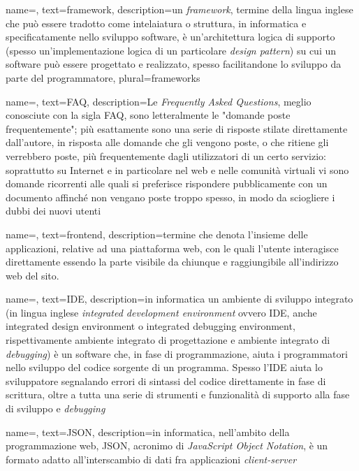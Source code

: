 {
    name=,
    text=framework,
    description={un \emph{framework}, termine della lingua inglese che può essere tradotto come intelaiatura o struttura, in informatica e specificatamente nello sviluppo software, è un'architettura logica di supporto (spesso un'implementazione logica di un particolare \emph{design pattern}) su cui un software può essere progettato e realizzato, spesso facilitandone lo sviluppo da parte del programmatore},
    plural=frameworks
}

{
    name=,
    text=FAQ,
    description={Le \emph{Frequently Asked Questions}, meglio conosciute con la sigla FAQ, sono letteralmente le "domande poste frequentemente"; più esattamente sono una serie di risposte stilate direttamente dall'autore, in risposta alle domande che gli vengono poste, o che ritiene gli verrebbero poste, più frequentemente dagli utilizzatori di un certo servizio: soprattutto su Internet e in particolare nel web e nelle comunità virtuali vi sono domande ricorrenti alle quali si preferisce rispondere pubblicamente con un documento affinché non vengano poste troppo spesso, in modo da sciogliere i dubbi dei nuovi utenti}
}

{
    name=,
    text=frontend,
    description={termine che denota l’insieme delle applicazioni, relative ad una piattaforma
web, con le quali l’utente interagisce direttamente essendo la parte visibile da chiunque e raggiungibile all'indirizzo web del sito.}
}

{
    name=,
    text=IDE,
    description={in informatica un ambiente di sviluppo
integrato (in lingua inglese \emph{integrated development environment} ovvero IDE,
anche integrated design environment o integrated debugging environment, rispettivamente
ambiente integrato di progettazione e ambiente integrato di \emph{debugging})
è un software che, in fase di programmazione, aiuta i programmatori nello sviluppo
del codice sorgente di un programma. Spesso l’IDE aiuta lo sviluppatore
segnalando errori di sintassi del codice direttamente in fase di scrittura, oltre a
tutta una serie di strumenti e funzionalità di supporto alla fase di sviluppo e
\emph{debugging}}
}

{
    name=,
    text=JSON,
    description={in informatica, nell’ambito della programmazione
web, JSON, acronimo di \emph{JavaScript Object Notation}, è un formato adatto
all’interscambio di dati fra applicazioni \emph{client-server}}
}

